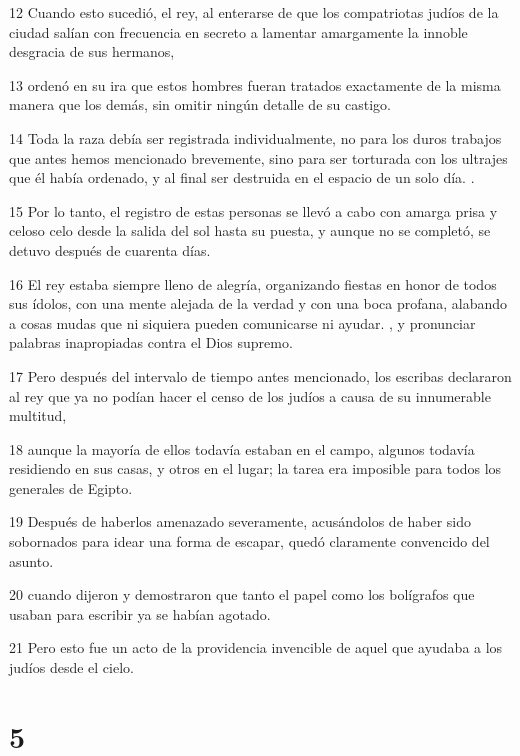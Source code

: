 \par 12 Cuando esto sucedió, el rey, al enterarse de que los compatriotas judíos de la ciudad salían con frecuencia en secreto a lamentar amargamente la innoble desgracia de sus hermanos,
\par 13 ordenó en su ira que estos hombres fueran tratados exactamente de la misma manera que los demás, sin omitir ningún detalle de su castigo.
\par 14 Toda la raza debía ser registrada individualmente, no para los duros trabajos que antes hemos mencionado brevemente, sino para ser torturada con los ultrajes que él había ordenado, y al final ser destruida en el espacio de un solo día. .
\par 15 Por lo tanto, el registro de estas personas se llevó a cabo con amarga prisa y celoso celo desde la salida del sol hasta su puesta, y aunque no se completó, se detuvo después de cuarenta días.
\par 16 El rey estaba siempre lleno de alegría, organizando fiestas en honor de todos sus ídolos, con una mente alejada de la verdad y con una boca profana, alabando a cosas mudas que ni siquiera pueden comunicarse ni ayudar. , y pronunciar palabras inapropiadas contra el Dios supremo.
\par 17 Pero después del intervalo de tiempo antes mencionado, los escribas declararon al rey que ya no podían hacer el censo de los judíos a causa de su innumerable multitud,
\par 18 aunque la mayoría de ellos todavía estaban en el campo, algunos todavía residiendo en sus casas, y otros en el lugar; la tarea era imposible para todos los generales de Egipto.
\par 19 Después de haberlos amenazado severamente, acusándolos de haber sido sobornados para idear una forma de escapar, quedó claramente convencido del asunto.
\par 20 cuando dijeron y demostraron que tanto el papel como los bolígrafos que usaban para escribir ya se habían agotado.
\par 21 Pero esto fue un acto de la providencia invencible de aquel que ayudaba a los judíos desde el cielo.

\chapter{5}

